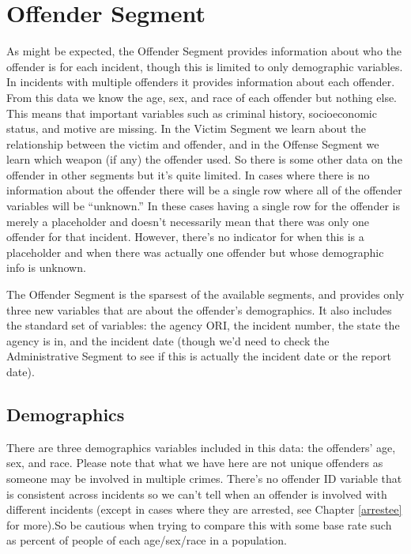 \documentclass[
]{krantz}
\begin{document}
\chapter{Offender Segment}\label{offender-segment-1}

As might be expected, the Offender Segment provides
information about who the offender is for each incident,
though this is limited to only demographic variables. In
incidents with multiple offenders it provides information
about each offender. From this data we know the age, sex,
and race of each offender but nothing else. This means that
important variables such as criminal history, socioeconomic
status, and motive are missing. In the Victim Segment we
learn about the relationship between the victim and
offender, and in the Offense Segment we learn which weapon
(if any) the offender used. So there is some other data on
the offender in other segments but it's quite limited. In
cases where there is no information about the offender there
will be a single row where all of the offender variables
will be ``unknown.'' In these cases having a single row for
the offender is merely a placeholder and doesn't necessarily
mean that there was only one offender for that incident.
However, there's no indicator for when this is a placeholder
and when there was actually one offender but whose
demographic info is unknown.

The Offender Segment is the sparsest of the available
segments, and provides only three new variables that are
about the offender's demographics. It also includes the
standard set of variables: the agency ORI, the incident
number, the state the agency is in, and the incident date
(though we'd need to check the Administrative Segment to see
if this is actually the incident date or the report date).

\section{Demographics}\label{demographics-1}

There are three demographics variables included in this
data: the offenders' age, sex, and race. Please note that
what we have here are not unique offenders as someone may be
involved in multiple crimes. There's no offender ID variable
that is consistent across incidents so we can't tell when an
offender is involved with different incidents (except in
cases where they are arrested, see Chapter \ref{arrestee}
for more).So be cautious when trying to compare this with
some base rate such as percent of people of each
age/sex/race in a population.
\end{document}
